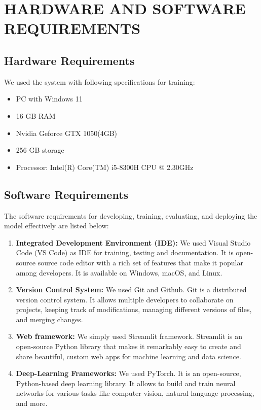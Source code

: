 \newpage
\section{HARDWARE AND SOFTWARE REQUIREMENTS}
\subsection{Hardware Requirements}
We used the system with following specifications for training:
\begin{itemize}
    \item PC with Windows 11
    \item 16 GB RAM 
    \item Nvidia Geforce GTX 1050(4GB)
    \item 256 GB storage
    \item Processor: Intel(R) Core(TM) i5-8300H CPU @ 2.30GHz
\end{itemize}
\subsection{Software Requirements}
The software requirements for developing, training, evaluating, and deploying the
model effectively are listed below: 
\begin{enumerate}
    \item {\bf Integrated Development Environment (IDE):} We used Visual Studio Code (VS Code) as IDE for training, testing and documentation. 
    It  is open-source source code editor with a rich set of features that make it popular among developers. It is available on Windows, macOS, and Linux.
    \item {\bf Version Control System:} We used Git and Github. Git is a distributed version control system. It allows multiple developers to collaborate on projects, keeping track of modifications, managing different versions of files, and merging changes.
    \item {\bf Web framework:} We simply used Streamlit framework. Streamlit is an open-source Python library that makes it remarkably easy to create and share beautiful, custom web apps for machine learning and data science.
    \item {\bf Deep-Learning Frameworks:} We used PyTorch. It is an open-source, Python-based deep learning library. It allows to build and train neural networks for various tasks like computer vision, natural language processing, and more.
\end{enumerate}